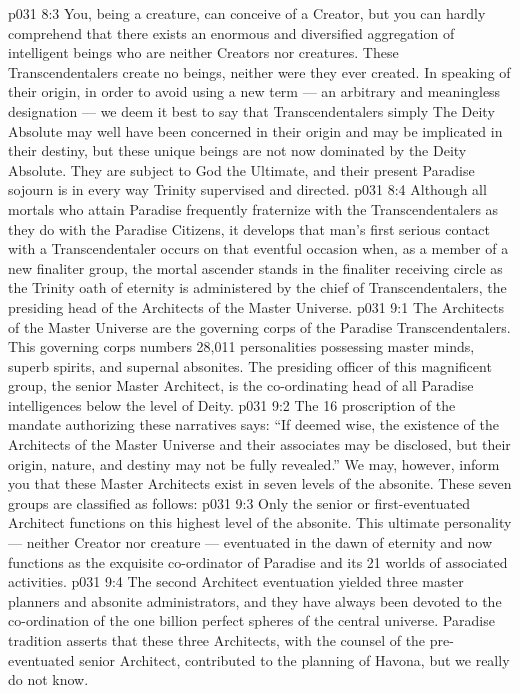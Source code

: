 \vs p031 8:3 You, being a creature, can conceive of a Creator, but you can hardly comprehend that there exists an enormous and diversified aggregation of intelligent beings who are neither Creators nor creatures. These Transcendentalers create no beings, neither were they ever created. In speaking of their origin, in order to avoid using a new term --- an arbitrary and meaningless designation --- we deem it best to say that Transcendentalers simply  The Deity Absolute may well have been concerned in their origin and may be implicated in their destiny, but these unique beings are not now dominated by the Deity Absolute. They are subject to God the Ultimate, and their present Paradise sojourn is in every way Trinity supervised and directed.
\vs p031 8:4 Although all mortals who attain Paradise frequently fraternize with the Transcendentalers as they do with the Paradise Citizens, it develops that man’s first serious contact with a Transcendentaler occurs on that eventful occasion when, as a member of a new finaliter group, the mortal ascender stands in the finaliter receiving circle as the Trinity oath of eternity is administered by the chief of Transcendentalers, the presiding head of the Architects of the Master Universe.
\vs p031 9:1 The Architects of the Master Universe are the governing corps of the Paradise Transcendentalers. This governing corps numbers 28,011 personalities possessing master minds, superb spirits, and supernal absonites. The presiding officer of this magnificent group, the senior Master Architect, is the co\hyp{}ordinating head of all Paradise intelligences below the level of Deity.
\vs p031 9:2 The 16 proscription of the mandate authorizing these narratives says: “If deemed wise, the existence of the Architects of the Master Universe and their associates may be disclosed, but their origin, nature, and destiny may not be fully revealed.” We may, however, inform you that these Master Architects exist in seven levels of the absonite. These seven groups are classified as follows:
\vs p031 9:3 \bibnobreakspace {} Only the senior or first\hyp{}eventuated Architect functions on this highest level of the absonite. This ultimate personality --- neither Creator nor creature --- eventuated in the dawn of eternity and now functions as the exquisite co\hyp{}ordinator of Paradise and its 21 worlds of associated activities.
\vs p031 9:4 \bibnobreakspace {} The second Architect eventuation yielded three master planners and absonite administrators, and they have always been devoted to the co\hyp{}ordination of the one billion perfect spheres of the central universe. Paradise tradition asserts that these three Architects, with the counsel of the pre\hyp{}eventuated senior Architect, contributed to the planning of Havona, but we really do not know.
